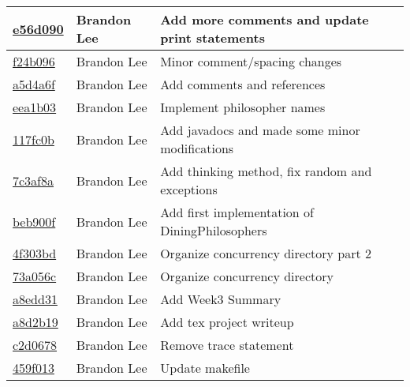 \documentclass[letterpaper,10pt,titlepage]{article}
\begin{document}
\begin{tabular}{l l l}
\href{https://github.com/brandonlee503/Operating-Systems-II/commit/e56d09079e03367e583ac72250e33728a0d651a1}{e56d090} & Brandon Lee & Add more comments and update print statements\\\hline
\href{https://github.com/brandonlee503/Operating-Systems-II/commit/f24b096ff0f0c0306da301b8b54d4a3d7d75cd19}{f24b096} & Brandon Lee & Minor comment/spacing changes\\\hline
\href{https://github.com/brandonlee503/Operating-Systems-II/commit/a5d4a6fa3e3d981bdc98e1979dc407d143a3874f}{a5d4a6f} & Brandon Lee & Add comments and references\\\hline
\href{https://github.com/brandonlee503/Operating-Systems-II/commit/eea1b0342c27bc634419978453ae710d02eef85e}{eea1b03} & Brandon Lee & Implement philosopher names\\\hline
\href{https://github.com/brandonlee503/Operating-Systems-II/commit/117fc0bda999c55c5b1fb011a8e9fc6d84470767}{117fc0b} & Brandon Lee & Add javadocs and made some minor modifications\\\hline
\href{https://github.com/brandonlee503/Operating-Systems-II/commit/7c3af8a0c4de6a4ef03ce9d7af2b7af8cfbe0861}{7c3af8a} & Brandon Lee & Add thinking method, fix random and exceptions\\\hline
\href{https://github.com/brandonlee503/Operating-Systems-II/commit/beb900f767ccafaac3462b5a68be9627587657f3}{beb900f} & Brandon Lee & Add first implementation of DiningPhilosophers\\\hline
\href{https://github.com/brandonlee503/Operating-Systems-II/commit/4f303bd6cf93f8a6238d2ab0bf7f0f57d3c1ae0b}{4f303bd} & Brandon Lee & Organize concurrency directory part 2\\\hline
\href{https://github.com/brandonlee503/Operating-Systems-II/commit/73a056c5ce444a03cd56196fd8ba6bb013f1bde9}{73a056c} & Brandon Lee & Organize concurrency directory\\\hline
\href{https://github.com/brandonlee503/Operating-Systems-II/commit/a8edd31487ed8d84660f5a795dc0a6f779d2c8fe}{a8edd31} & Brandon Lee & Add Week3 Summary\\\hline
\href{https://github.com/brandonlee503/Operating-Systems-II/commit/a8d2b19686aef30634d471643cad88dcd91c080f}{a8d2b19} & Brandon Lee & Add tex project writeup\\\hline
\href{https://github.com/brandonlee503/Operating-Systems-II/commit/c2d067844a4f23e6a33d7c7e4e9ffcece90510cb}{c2d0678} & Brandon Lee & Remove trace statement\\\hline
\href{https://github.com/brandonlee503/Operating-Systems-II/commit/459f01316fb990f1fd9ffa1fa6348fe736128d6c}{459f013} & Brandon Lee & Update makefile\\\hline

\end{tabular}
\end{document}
